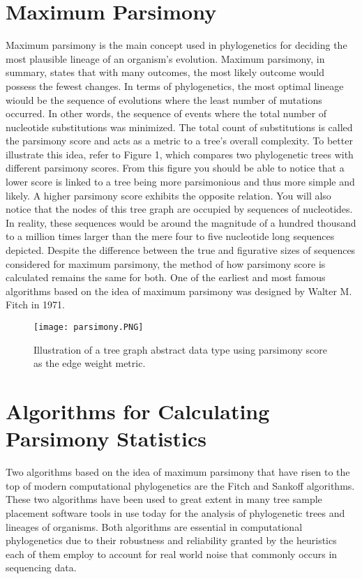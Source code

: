 \documentclass[12pt,journal,compsoc]{IEEEtran}
\begin{document}
\section{Maximum Parsimony}
Maximum parsimony is the main concept used in phylogenetics for deciding the most plausible lineage of an organism's evolution. Maximum parsimony, in summary, states that with many outcomes, the most likely outcome would possess the fewest changes. In terms of phylogenetics, the most optimal lineage wiould be the sequence of evolutions where the least number of mutations occurred. In other words, the sequence of events where the total number of nucleotide substitutions was minimized. The total count of substitutions is called the parsimony score and acts as a metric to a tree’s overall complexity. To better illustrate this idea, refer to Figure 1, which compares two phylogenetic trees with different parsimony scores. From this figure you should be able to notice that a lower score is linked to a tree being more parsimonious and thus more simple and likely. A higher parsimony score exhibits the opposite relation. You will also notice that the nodes of this tree graph are occupied by sequences of nucleotides. In reality, these sequences would be around the magnitude of a hundred thousand to a million times larger than the mere four to five nucleotide long sequences depicted. Despite the difference between the true and figurative sizes of sequences considered for maximum parsimony, the method of how parsimony score is calculated remains the same for both. One of the earliest and most famous algorithms based on the idea of maximum parsimony was designed by Walter M. Fitch in 1971. 


\begin{figure}
    \centering
    \texttt{[image: parsimony.PNG]}
    \caption{Illustration of a tree graph abstract data type using parsimony score as the edge weight metric.}
\end{figure}

\section{Algorithms for Calculating Parsimony Statistics}
Two algorithms based on the idea of maximum parsimony that have risen to the top of modern computational phylogenetics are the Fitch and Sankoff algorithms. These two algorithms have been used to great extent in many tree sample placement software tools in use today for the analysis of phylogenetic trees and lineages of organisms. Both algorithms are essential in computational phylogenetics due to their robustness and reliability granted by the heuristics each of them employ to account for real world noise that commonly occurs in sequencing data.
\end{document}
